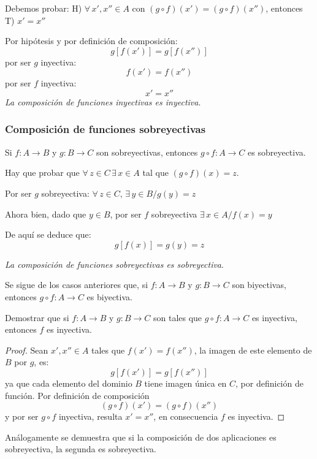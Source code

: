 \begin{fmd-proof}
	Debemos probar: H) $\forall \, x', x'' \in A$ con $(g \circ f)(x') = (g \circ f)(x'')$, 
	entonces T) $x' = x''$
	
	Por hipótesis y por definición de composición:
	\[ g[f(x')] = g[f(x'')] \]
	por ser $g$ inyectiva:
	\[ f(x') = f(x'')\]
	por ser $f$ inyectiva:
	\[x' = x'' \]
	\emph{La composición de funciones inyectivas es inyectiva}.
\end{fmd-proof}


\subsubsection{Composición de funciones sobreyectivas} \label{sec:comsob}
\vspace{1em}
\begin{fmd-proposition}
	Si $f: A \rightarrow B$ y $g: B \rightarrow C$ son sobreyectivas, entonces $g \circ f: 
	A \rightarrow C$ es sobreyectiva.
\end{fmd-proposition}
\begin{fmd-proof}
	Hay que probar que $\forall \, z \in C \, \exists \, x \in A$ tal que
	$(g \circ f)(x) = z$.\vspace{2mm}
	
	Por ser $g$ sobreyectiva:
	$\forall \, z \in C, \, \exists \, y \in B / g(y) = z$
	
	Ahora bien, dado que $y \in B$, por ser $f$ sobreyectiva
	$\exists \, x \in A / f(x) = y$
	
	De aquí se deduce que:
	\[g[f(x)] = g(y) = z\]
	
	\emph{La composición de funciones sobreyectivas es sobreyectiva}.
\end{fmd-proof}

Se sigue de los casos anteriores que, si $f: A \rightarrow B$ y $g: B \rightarrow C$ son biyectivas, entonces $g \circ f: 
A \rightarrow C$ es biyectiva.

\begin{fmd-example}
	Demostrar que si $f: A \rightarrow B$ y $g: B \rightarrow C$ son tales que
	$g \circ f: A \rightarrow C$ es inyectiva, entonces $f$ es inyectiva.\vspace{-2mm}
	
	\begin{proof}
		Sean $x', x'' \in A$ tales que $f(x') = f(x'')$, la imagen de este elemento de $B$
		por $g$, es:
		\[ g[f(x')] = g[f(x'')] \]
		ya que cada elemento del dominio $B$ tiene imagen única en $C$, por definición de
		función. Por definición de composición
		\[ (g \circ f)(x') = (g \circ f)(x'') \]
		y por ser $g \circ f$ inyectiva, resulta $x'=x''$, en consecuencia $f$ es
		inyectiva.
	\end{proof}
	
	Análogamente se demuestra que si la composición de dos aplicaciones es sobreyectiva,
	la segunda es sobreyectiva.
\end{fmd-example}

